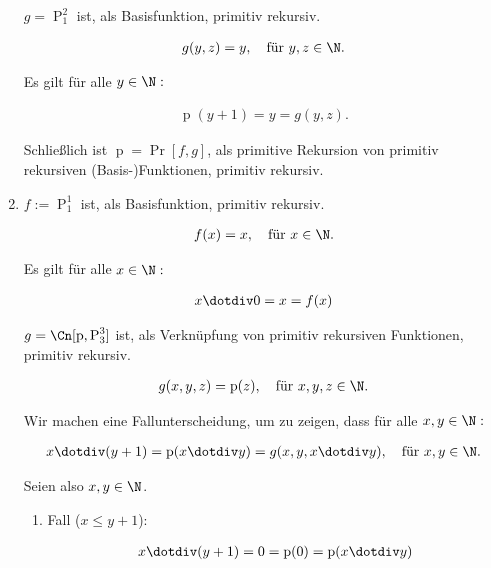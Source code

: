 \begin{solution}
\begin{enumerate}[label = (\alph*)]
    $g = \operatorname P_1^2$ ist, als Basisfunktion, primitiv rekursiv.

    \begin{align*}
        g(y, z) = y, \quad \text{für}~ y, z \in \N.
    \end{align*}

    Es gilt für alle $y \in \N:$

    \begin{align*}
        \operatorname p(y + 1) = y = g(y, z).
    \end{align*}

    Schließlich ist $\operatorname p = \Pr[f, g]$, als primitive Rekursion von primitiv rekursiven (Basis-)Funktionen, primitiv rekursiv.

    \item $f := \operatorname P_1^1$ ist, als Basisfunktion, primitiv rekursiv.
    
    \begin{align*}
        f(x) = x, \quad \text{für}~ x \in \N.
    \end{align*}
    
    Es gilt für alle $x \in \N:$

    \begin{align*}
        x \dotdiv 0 = x = f(x)
    \end{align*}
    
    $g = \Cn[\operatorname p, \operatorname P_3^3]$ ist, als Verknüpfung von primitiv rekursiven Funktionen, primitiv rekursiv.

    \begin{align*}
        g(x, y, z) = \operatorname p(z), \quad \text{für}~ x, y, z \in \N.
    \end{align*}

    Wir machen eine Fallunterscheidung, um zu zeigen, dass für alle $x, y \in \N:$

    \begin{align*}
        x \dotdiv (y + 1) = \operatorname p(x \dotdiv y) = g(x, y, x \dotdiv y), \quad \text{für}~ x, y \in \N.
    \end{align*}

    Seien also $x, y \in \N$.

    \begin{enumerate}[label = \arabic*.]

        \item Fall ($x \leq y + 1$):
        
        \begin{align*}
            x \dotdiv (y + 1)
            =
            0
            =
            \operatorname p(0)
            =
            \operatorname p(x \dotdiv y)
        \end{align*}


\end{enumerate}
\end{enumerate}
\end{solution}
